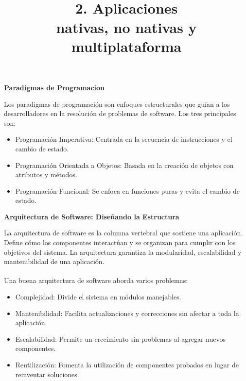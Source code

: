 \documentclass[12pt,twocolumn]{article}
\begin{document}
\textbf{Paradigmas de Programacion}

Los paradigmas de programación son enfoques estructurales que guían a los desarrolladores en la resolución de problemas de software. Los tres principales son:

\begin{itemize}
	\item Programación Imperativa: Centrada en la secuencia de instrucciones y el cambio de estado.
	\item Programación Orientada a Objetos: Basada en la creación de objetos con atributos y métodos.
	\item Programación Funcional: Se enfoca en funciones puras y evita el cambio de estado.
\end{itemize}

\textbf{Arquitectura de Software: Diseñando la Estructura}

La arquitectura de software es la columna vertebral que sostiene una aplicación. Define cómo los componentes interactúan y se organizan para cumplir con los objetivos del sistema. La arquitectura garantiza la modularidad, escalabilidad y mantenibilidad de una aplicación.
\\
\\
Una buena arquitectura de software aborda varios problemas:

\begin{itemize}
	\item Complejidad: Divide el sistema en módulos manejables.
	\item Mantenibilidad: Facilita actualizaciones y correcciones sin afectar a toda la aplicación.
	\item Escalabilidad: Permite un crecimiento sin problemas al agregar nuevos componentes.
	\item Reutilización: Fomenta la utilización de componentes probados en lugar de reinventar soluciones.
	
\end{itemize}



\title{\textbf{\huge 
		\\
		2. Aplicaciones
		\\ 
		nativas, no nativas y multiplataforma} }
\end{document}
